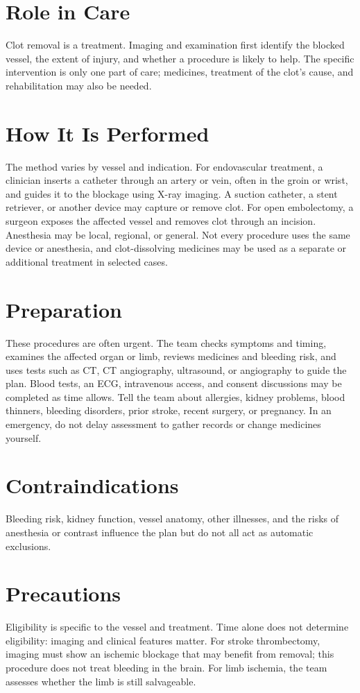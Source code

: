 \section*{Role in Care}
Clot removal is a treatment. Imaging and examination first identify the blocked vessel, the extent of injury, and whether a procedure is likely to help. The specific intervention is only one part of care; medicines, treatment of the clot's cause, and rehabilitation may also be needed.

\section*{How It Is Performed}
The method varies by vessel and indication. For endovascular treatment, a clinician inserts a catheter through an artery or vein, often in the groin or wrist, and guides it to the blockage using X-ray imaging. A suction catheter, a stent retriever, or another device may capture or remove clot. For open embolectomy, a surgeon exposes the affected vessel and removes clot through an incision. Anesthesia may be local, regional, or general. Not every procedure uses the same device or anesthesia, and clot-dissolving medicines may be used as a separate or additional treatment in selected cases.

\section*{Preparation}
These procedures are often urgent. The team checks symptoms and timing, examines the affected organ or limb, reviews medicines and bleeding risk, and uses tests such as CT, CT angiography, ultrasound, or angiography to guide the plan. Blood tests, an ECG, intravenous access, and consent discussions may be completed as time allows. Tell the team about allergies, kidney problems, blood thinners, bleeding disorders, prior stroke, recent surgery, or pregnancy. In an emergency, do not delay assessment to gather records or change medicines yourself.

\section*{Contraindications}
Bleeding risk, kidney function, vessel anatomy, other illnesses, and the risks of anesthesia or contrast influence the plan but do not all act as automatic exclusions.

\section*{Precautions}
Eligibility is specific to the vessel and treatment. Time alone does not determine eligibility: imaging and clinical features matter. For stroke thrombectomy, imaging must show an ischemic blockage that may benefit from removal; this procedure does not treat bleeding in the brain. For limb ischemia, the team assesses whether the limb is still salvageable.

